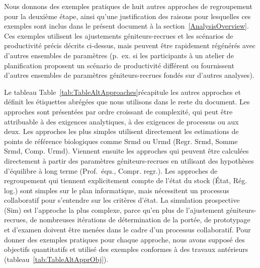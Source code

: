 \documentclass[french,11pt]{book}
\begin{document}
Nous donnons des exemples pratiques de huit autres approches de regroupement pour la deuxième étape, ainsi qu'une justification des raisons pour lesquelles ces exemples sont inclus dans le présent document à la section~\ref{AnalysisOverview}. Ces exemples utilisent les ajustements géniteurs-recrues et les scénarios de productivité précis décrits ci-dessus, mais peuvent être rapidement régénérés avec d'autres ensembles de paramètres (p.~ex. si les participants à un atelier de planification proposent un scénario de productivité différent ou fournissent d'autres ensembles de paramètres géniteurs-recrues fondés sur d'autres analyses).

Le tableau Table~\ref{tab:TableAltApproaches}récapitule les autres approches et définit les étiquettes abrégées que nous utilisons dans le reste du document. Les approches sont présentées par ordre croissant de complexité, qui peut être attribuable à des exigences analytiques, à des exigences de processus ou aux deux. Les approches les plus simples utilisent directement les estimations de points de référence biologiques comme Srmd ou Urmd (Regr. Srmd, Somme Srmd, Comp. Urmd). Viennent ensuite les approches qui peuvent être calculées directement à partir des paramètres géniteurs-recrues en utilisant des hypothèses d'équilibre à long terme (Prof.~équ., Compr. regr.). Les approches de regroupement qui tiennent explicitement compte de l'état du stock (État, Rég. log.) sont simples sur le plan informatique, mais nécessitent un processus collaboratif pour s'entendre sur les critères d'état. La simulation prospective (Sim) est l'approche la plus complexe, parce qu'en plus de l'ajustement géniteurs-recrues, de nombreuses itérations de détermination de la portée, de prototypage et d'examen doivent être menées dans le cadre d'un processus collaboratif. Pour donner des exemples pratiques pour chaque approche, nous avons supposé des objectifs quantitatifs et utilisé des exemples conformes à des travaux antérieurs (tableau~\ref{tab:TableAltApprObj}).
\end{document}

